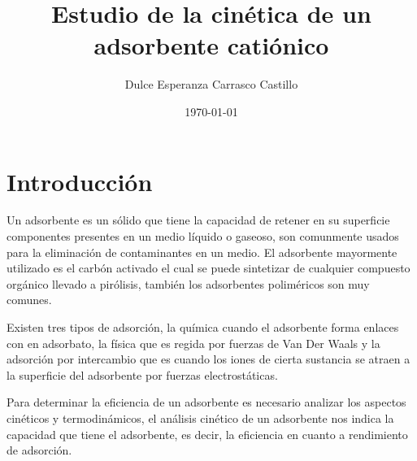 \documentclass[12pt, letterpaper] {article}
\author{Dulce Esperanza Carrasco Castillo \\[0.9mm]}
\title{Estudio de la cinética de un adsorbente catiónico}
\date{\today}
\begin{document}

\section{Introducción}
Un adsorbente es un sólido que tiene la capacidad de retener en su superficie componentes presentes en un medio líquido o gaseoso, son comunmente usados para la eliminación de contaminantes en un medio. El adsorbente mayormente utilizado es el carbón activado el cual se puede sintetizar de cualquier compuesto orgánico llevado a pirólisis, también  los adsorbentes poliméricos son muy comunes. \par Existen tres tipos de adsorción, la química cuando el adsorbente forma enlaces con en adsorbato, la física que es regida por fuerzas de Van Der Waals y la adsorción por intercambio que es cuando los iones de cierta sustancia se atraen a la superficie del adsorbente por fuerzas electrostáticas.\par
Para determinar la eficiencia de un adsorbente es necesario analizar los aspectos cinéticos y termodinámicos\cite{art1}, el análisis cinético de un adsorbente nos indica la capacidad que tiene el adsorbente, es decir, la eficiencia en cuanto a rendimiento de adsorción.
\end{document}
